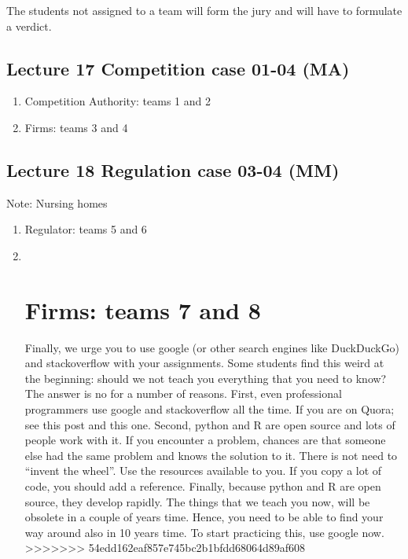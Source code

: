 \documentclass[]{book}
\providecommand{\tightlist}{%
  \setlength{\itemsep}{0pt}\setlength{\parskip}{0pt}}
\begin{document}
The students not assigned to a team will form the jury and will have to
formulate a verdict.

\section{Lecture 17 Competition case 01-04
(MA)}\label{lecture-17-competition-case-01-04-ma}

\begin{enumerate}
\def\labelenumi{\alph{enumi}.}
\tightlist
\item
  Competition Authority: teams 1 and 2
\item
  Firms: teams 3 and 4
\end{enumerate}

\section{Lecture 18 Regulation case 03-04
(MM)}\label{lecture-18-regulation-case-03-04-mm}

Note: Nursing homes

\begin{enumerate}
\def\labelenumi{\alph{enumi}.}
\item
  Regulator: teams 5 and 6
\item ~
  \chapter{Firms: teams 7 and 8}\label{firms-teams-7-and-8}

  Finally, we urge you to use google (or other search engines like
  DuckDuckGo) and stackoverflow with your assignments. Some students
  find this weird at the beginning: should we not teach you everything
  that you need to know? The answer is no for a number of reasons.
  First, even professional programmers use google and stackoverflow all
  the time. If you are on Quora; see this post and this one. Second,
  python and R are open source and lots of people work with it. If you
  encounter a problem, chances are that someone else had the same
  problem and knows the solution to it. There is not need to ``invent
  the wheel''. Use the resources available to you. If you copy a lot of
  code, you should add a reference. Finally, because python and R are
  open source, they develop rapidly. The things that we teach you now,
  will be obsolete in a couple of years time. Hence, you need to be able
  to find your way around also in 10 years time. To start practicing
  this, use google now.
  \textgreater{}\textgreater{}\textgreater{}\textgreater{}\textgreater{}\textgreater{}\textgreater{}
  54edd162eaf857e745bc2b1bfdd68064d89af608
\end{enumerate}
\end{document}

